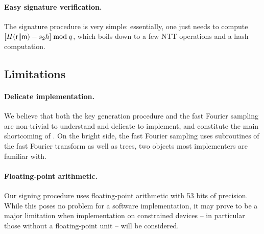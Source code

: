 \paragraph{Easy signature verification.} The signature procedure is very simple: essentially, one just needs to compute $[H(\textsf{r}\|\textsf{m}) - s_2 h] \bmod q$, which boils down to a few NTT operations and a hash computation.


\subsection{Limitations}


\paragraph{Delicate implementation.} We believe that both the key generation procedure and the fast Fourier sampling are non-trivial to understand and delicate to implement, and constitute the main shortcoming of \falcon. On the bright side, the fast Fourier sampling uses subroutines of the fast Fourier transform as well as trees, two objects most implementers are familiar with.

\paragraph{Floating-point arithmetic.} Our signing procedure uses floating-point arithmetic with 53 bits of precision. While this poses no problem for a software implementation, it may prove to be a major limitation when implementation on constrained devices -- in particular those without a floating-point unit -- will be considered.




